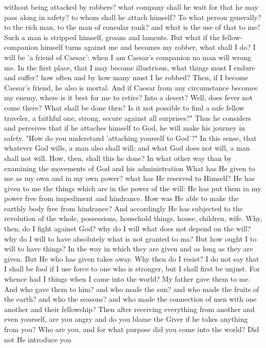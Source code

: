 \documentclass[a4paper]{article}
\begin{document}
without being attacked by robbers? what company shall he wait for that he may
pass along in safety? to whom shall he attach himself? To what person
generally? to the rich man, to the man of consular rank? and what is the use of
that to me? Such a man is stripped himself, groans and laments. But what if the
fellow-companion himself turns against me and becomes my robber, what shall I
do? I will be 'a friend of Caesar': when I am Caesar's companion no man will
wrong me. In the first place, that I may become illustrious, what things must I
endure and suffer? how often and by how many must I he robbed? Then, if I
become Caesar's friend, he also is mortal. And if Caesar from any circumstance
becomes my enemy, where is it best for me to retire? Into a desert? Well, does
fever not come there? What shall be done then? Is it not possible to find a
safe fellow traveler, a faithful one, strong, secure against all surprises?"
Thus he considers and perceives that if he attaches himself to God, he will
make his journey in safety.
    "How do you understand 'attaching yourself to God'?" In this sense, that
whatever God wills, a man also shall will; and what God does not will, a man
shall not will. How, then, shall this he done? In what other way than by
examining the movements of God and his administration What has He given to me
as my own and in my own power? what has He reserved to Himself? He has given to
me the things which are in the power of the will: He has put them in my power
free from impediment and hindrance. How was He able to make the earthly body
free from hindrance? And accordingly He has subjected to the revolution of the
whole, possessions, household things, house, children, wife. Why, then, do I
fight against God? why do I will what does not depend on the will? why do I
will to have absolutely what is not granted to ma? But how ought I to will to
have things? In the way in which they are given and as long as they are given.
But He who has given takes away. Why then do I resist? I do not say that I
shall be fool if I use force to one who is stronger, but I shall first be
unjust. For whence had I things when I came into the world? My father gave them
to me. And who gave them to him? and who made the sun? and who made the fruits
of the earth? and who the seasons? and who made the connection of men with one
another and their fellowship?
    Then after receiving everything from another and even yourself, are you
angry and do you blame the Giver if he takes anything from you? Who are you,
and for what purpose did you come into the world? Did not He introduce you
\end{document}
